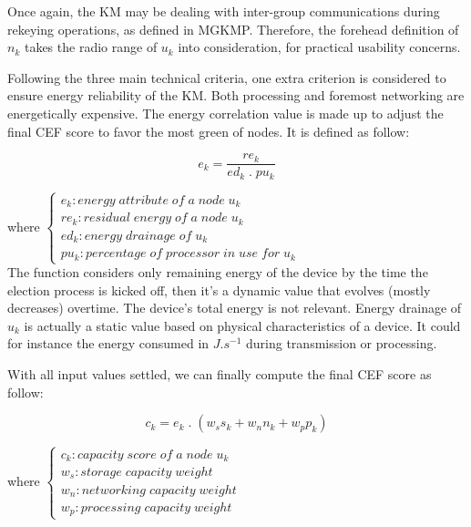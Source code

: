 Once again, the KM may be dealing with inter-group communications during rekeying operations, as defined in MGKMP. Therefore, the forehead definition of $n_k$ takes the radio range of $u_k$ into consideration, for practical usability concerns.

Following the three main technical criteria, one extra criterion is considered to ensure energy reliability of the KM. Both processing and foremost networking are energetically expensive. The energy correlation value is made up to adjust the final CEF score to favor the most green of nodes. It is defined as follow:

\begin{equation}\label{eq4}
	e_k = \frac{re_k}{ed_k \; .\; pu_k}
\end{equation}

where
\begin{math}
	\left\{
	\begin{array}{l}
		e_k: energy\; attribute\; of\; a\; node\; u_k\\
		re_k: residual\; energy\; of\; a\; node\; u_k\\
		ed_k: energy\; drainage\; of\; u_k\\
		pu_k: percentage\; of\; processor\; in\; use\; for\; u_k
	\end{array}
	\right.
\end{math}\\

The function considers only remaining energy of the device by the time the election process is kicked off, then it’s a dynamic value that evolves (mostly decreases) overtime. The device’s total energy is not relevant. Energy drainage of $u_k$ is actually a static value based on physical characteristics of a device. It could for instance the energy consumed in $J.s^{-1}$ during transmission or processing.

With all input values settled, we can finally compute the final CEF score as follow:

\begin{equation}\label{eq5}
	c_k = e_k \; .\; \left( w_s s_k + w_n n_k +  w_p p_k \right)
\end{equation}

where
\begin{math}
	\left\{
	\begin{array}{l}
		c_k: capacity\; score\; of\; a\; node\; u_k\\
		w_s: storage\; capacity\; weight\\
		w_n: networking\; capacity\; weight\\
		w_p: processing\; capacity\; weight
	\end{array}
	\right.
\end{math}\\

